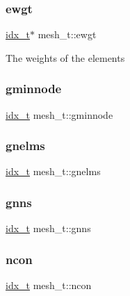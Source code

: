 \mbox{\label{a00738_a0a2369b26fbcc6229681ec8cb9e8f713}} 
\subsubsection{\texorpdfstring{ewgt}{ewgt}}
{\footnotesize\ttfamily \hyperlink{a00876_aaa5262be3e700770163401acb0150f52}{idx\+\_\+t}$\ast$ mesh\+\_\+t\+::ewgt}

The weights of the elements \mbox{\label{a00738_aae7efc9e003a2c4da4a50040e503c488}} 
\subsubsection{\texorpdfstring{gminnode}{gminnode}}
{\footnotesize\ttfamily \hyperlink{a00876_aaa5262be3e700770163401acb0150f52}{idx\+\_\+t} mesh\+\_\+t\+::gminnode}

\mbox{\label{a00738_ad2a13c39ecaddc9add6afe612f05bea4}} 
\subsubsection{\texorpdfstring{gnelms}{gnelms}}
{\footnotesize\ttfamily \hyperlink{a00876_aaa5262be3e700770163401acb0150f52}{idx\+\_\+t} mesh\+\_\+t\+::gnelms}

\mbox{\label{a00738_ad534138460141cd611dc0fae1baf8346}} 
\subsubsection{\texorpdfstring{gnns}{gnns}}
{\footnotesize\ttfamily \hyperlink{a00876_aaa5262be3e700770163401acb0150f52}{idx\+\_\+t} mesh\+\_\+t\+::gnns}

\mbox{\label{a00738_ad18b1da90165616c622c16ce79c6907f}} 
\subsubsection{\texorpdfstring{ncon}{ncon}}
{\footnotesize\ttfamily \hyperlink{a00876_aaa5262be3e700770163401acb0150f52}{idx\+\_\+t} mesh\+\_\+t\+::ncon}

